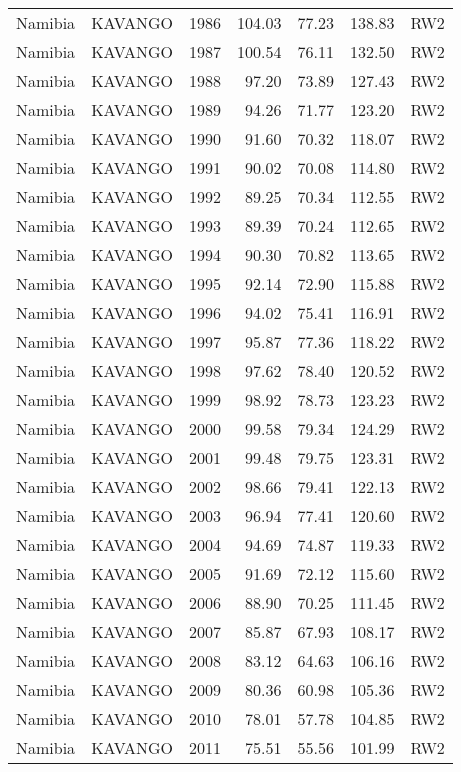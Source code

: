 \begin{longtable}{lllrrrl}
  Namibia & KAVANGO & 1986 & 104.03 & 77.23 & 138.83 & RW2 \\ 
  Namibia & KAVANGO & 1987 & 100.54 & 76.11 & 132.50 & RW2 \\ 
  Namibia & KAVANGO & 1988 & 97.20 & 73.89 & 127.43 & RW2 \\ 
  Namibia & KAVANGO & 1989 & 94.26 & 71.77 & 123.20 & RW2 \\ 
  Namibia & KAVANGO & 1990 & 91.60 & 70.32 & 118.07 & RW2 \\ 
  Namibia & KAVANGO & 1991 & 90.02 & 70.08 & 114.80 & RW2 \\ 
  Namibia & KAVANGO & 1992 & 89.25 & 70.34 & 112.55 & RW2 \\ 
  Namibia & KAVANGO & 1993 & 89.39 & 70.24 & 112.65 & RW2 \\ 
  Namibia & KAVANGO & 1994 & 90.30 & 70.82 & 113.65 & RW2 \\ 
  Namibia & KAVANGO & 1995 & 92.14 & 72.90 & 115.88 & RW2 \\ 
  Namibia & KAVANGO & 1996 & 94.02 & 75.41 & 116.91 & RW2 \\ 
  Namibia & KAVANGO & 1997 & 95.87 & 77.36 & 118.22 & RW2 \\ 
  Namibia & KAVANGO & 1998 & 97.62 & 78.40 & 120.52 & RW2 \\ 
  Namibia & KAVANGO & 1999 & 98.92 & 78.73 & 123.23 & RW2 \\ 
  Namibia & KAVANGO & 2000 & 99.58 & 79.34 & 124.29 & RW2 \\ 
  Namibia & KAVANGO & 2001 & 99.48 & 79.75 & 123.31 & RW2 \\ 
  Namibia & KAVANGO & 2002 & 98.66 & 79.41 & 122.13 & RW2 \\ 
  Namibia & KAVANGO & 2003 & 96.94 & 77.41 & 120.60 & RW2 \\ 
  Namibia & KAVANGO & 2004 & 94.69 & 74.87 & 119.33 & RW2 \\ 
  Namibia & KAVANGO & 2005 & 91.69 & 72.12 & 115.60 & RW2 \\ 
  Namibia & KAVANGO & 2006 & 88.90 & 70.25 & 111.45 & RW2 \\ 
  Namibia & KAVANGO & 2007 & 85.87 & 67.93 & 108.17 & RW2 \\ 
  Namibia & KAVANGO & 2008 & 83.12 & 64.63 & 106.16 & RW2 \\ 
  Namibia & KAVANGO & 2009 & 80.36 & 60.98 & 105.36 & RW2 \\ 
  Namibia & KAVANGO & 2010 & 78.01 & 57.78 & 104.85 & RW2 \\ 
  Namibia & KAVANGO & 2011 & 75.51 & 55.56 & 101.99 & RW2 \\ 

\end{longtable}
